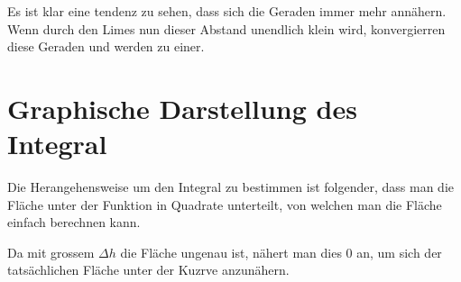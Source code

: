 \documentclass[a4paper,11pt]{report}
\begin{document}
Es ist klar eine tendenz zu sehen, dass sich die Geraden immer mehr annähern. Wenn durch den Limes nun dieser Abstand unendlich klein wird, konvergierren diese Geraden und werden zu einer.

\section{Graphische Darstellung des Integral}

\begin{minipage}{.5\textwidth}
    Die Herangehensweise um den Integral zu bestimmen ist folgender, dass man die Fläche unter der Funktion in Quadrate unterteilt, von welchen man die Fläche einfach berechnen kann.

    Da mit grossem $\Delta h$ die Fläche ungenau ist, nähert man dies 0 an, um sich der tatsächlichen Fläche unter der Kuzrve anzunähern.
\end{minipage}
\hspace{0.1\textwidth}
\begin{minipage}{.4\textwidth}
    \begin{center}
    \end{center}
\end{minipage}
\end{document}
